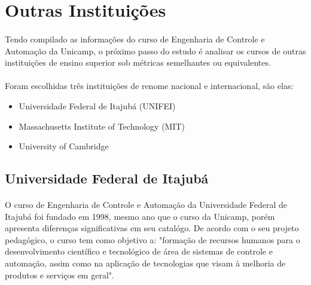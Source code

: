 \documentclass[12pt]{article} %
\begin{document}

\section{Outras Instituições}

\paragraph{} Tendo compilado as informações do curso de Engenharia de Controle e Automação da Unicamp, o próximo passo do estudo é analisar os cursos de outras instituições de ensino superior sob métricas semelhantes ou equivalentes. 

\paragraph{} Foram escolhidas três instituições de renome nacional e internacional, são elas:

\begin{itemize}
\item Universidade Federal de Itajubá (UNIFEI)
\item Massachusetts Institute of Technology (MIT)
\item University of Cambridge
\end{itemize}

\subsection{Universidade Federal de Itajubá}

\paragraph{} O curso de Engenharia de Controle e Automação da Universidade Federal de Itajubá foi fundado em 1998, mesmo ano que o curso da Unicamp, porém apresenta diferenças significativas em seu catalógo. De acordo com o seu projeto pedagógico, o curso tem como objetivo a: "formação de recursos humanos para o desenvolvimento científico e tecnológico de área de sistemas de controle e automação, assim como na aplicação de tecnologias que visam à melhoria de produtos e serviços em geral". 
\end{document}
